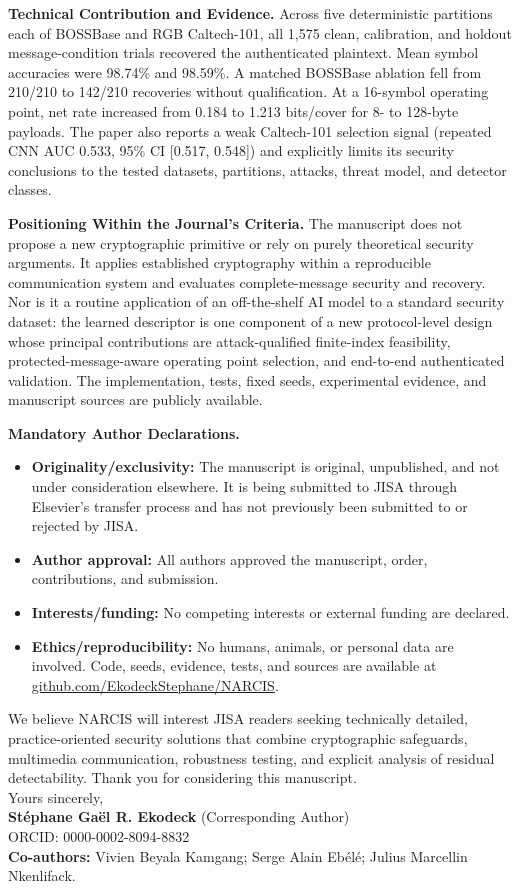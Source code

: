 \documentclass[10pt,letterpaper]{article}
\newcommand{\clhead}[1]{\textcolor{sectionblue}{\textbf{#1}}}
\begin{document}
\clhead{Technical Contribution and Evidence.}
Across five deterministic partitions each of BOSSBase and RGB Caltech-101,
all 1,575 clean, calibration, and holdout message-condition trials recovered
the authenticated plaintext. Mean symbol accuracies were 98.74\% and 98.59\%.
A matched BOSSBase ablation fell from 210/210 to 142/210 recoveries without
qualification. At a 16-symbol operating point, net rate increased from 0.184
to 1.213 bits/cover for 8- to 128-byte payloads. The paper also reports a weak
Caltech-101 selection signal (repeated CNN AUC 0.533, 95\% CI
[0.517, 0.548]) and explicitly limits its security conclusions to the tested
datasets, partitions, attacks, threat model, and detector classes.

\clhead{Positioning Within the Journal's Criteria.}
The manuscript does not propose a new cryptographic primitive or rely on
purely theoretical security arguments. It applies established cryptography
within a reproducible communication system and evaluates complete-message
security and recovery. Nor is it a routine application of an off-the-shelf
AI model to a standard security dataset: the learned descriptor is one
component of a new protocol-level design whose principal contributions are
attack-qualified finite-index feasibility, protected-message-aware operating
point selection, and end-to-end authenticated validation. The implementation,
tests, fixed seeds, experimental evidence, and manuscript sources are publicly
available.

\clhead{Mandatory Author Declarations.}
\begin{itemize}
\item \textbf{Originality/exclusivity:} The manuscript is original, unpublished,
and not under consideration elsewhere. It is being submitted to JISA through
Elsevier's transfer process and has not previously been submitted to or
rejected by JISA.
\item \textbf{Author approval:} All authors approved the manuscript, order,
contributions, and submission.
\item \textbf{Interests/funding:} No competing interests or external funding
are declared.
\item \textbf{Ethics/reproducibility:} No humans, animals, or personal data are
involved. Code, seeds, evidence, tests, and sources are available at
\href{https://github.com/EkodeckStephane/NARCIS}
{github.com/EkodeckStephane/NARCIS}.
\end{itemize}

We believe NARCIS will interest JISA readers seeking technically detailed,
practice-oriented security solutions that combine cryptographic safeguards,
multimedia communication, robustness testing, and explicit analysis of
residual detectability. Thank you for considering this manuscript.\\

Yours sincerely,\\

\textbf{St\'ephane Ga\"el R. Ekodeck} (Corresponding Author)\\
ORCID: 0000-0002-8094-8832\\
\textbf{Co-authors:} Vivien Beyala Kamgang; Serge Alain Eb\'el\'e; Julius
Marcellin Nkenlifack.
\end{document}
